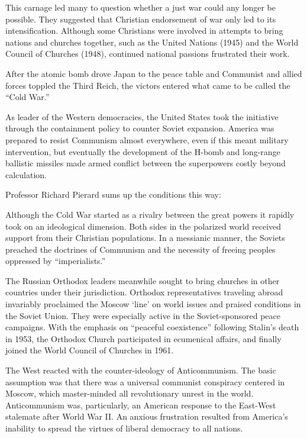 This carnage led many to question whether a just war could any longer be possible. They suggested
that Christian endorsement of war only led to its intensification. Although some Christians were
involved in attempts to bring nations and churches together, such as the United Nations (1945) and
the World Council of Churches (1948), continued national passions frustrated their work.

After the atomic bomb drove Japan to the peace table and Communist and allied forces toppled the
Third Reich, the victors entered what came to be called the “Cold War.”

As leader of the Western democracies, the United States took the initiative through the containment
policy to counter Soviet expansion. America was prepared to resist Communism almost everywhere, even
if this meant military intervention, but eventually the development of the H-bomb and long-range
ballistic missiles made armed conflict between the superpowers costly beyond calculation.

Professor Richard Pierard sums up the conditions this way:

\begin{blockquote}
Although the Cold War started as a rivalry between the great powers it rapidly took on an
ideological dimension. Both sides in the polarized world received support from their Christian
populations. In a messianic manner, the Soviets preached the doctrines of Communism and the
necessity of freeing peoples oppressed by “imperialists.”

The Russian Orthodox leaders meanwhile sought to bring churches in other countries under their
jurisdiction. Orthodox representatives traveling abroad invariably proclaimed the Moscow ‘line’ on
world issues and praised conditions in the Soviet Union. They were especially active in the
Soviet-sponsored peace campaigns. With the emphasis on “peaceful coexistence” following Stalin’s
death in 1953, the Orthodox Church participated in ecumenical affairs, and finally joined the World
Council of Churches in 1961.

The West reacted with the counter-ideology of Anticommunism. The basic assumption was that there was
a universal communist conspiracy centered in Moscow, which master-minded all revolutionary unrest in
the world. Anticommunism was, particularly, an American response to the East-West stalemate after
World War II. An anxious frustration resulted from America’s inability to spread the virtues of
liberal democracy to all nations.
\end{blockquote}

